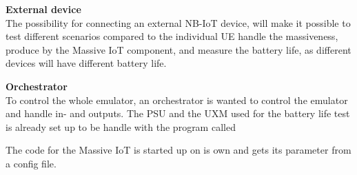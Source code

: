 \textbf{External device}\\
The possibility for connecting an external NB-IoT device, will make it possible to test different scenarios compared to the individual UE handle the massiveness, produce by the Massive IoT component, and measure the battery life, as different devices will have different battery life.

\textbf{Orchestrator}\\
To control the whole emulator, an orchestrator is wanted to control the emulator and handle in- and outputs. The PSU and the UXM used for the battery life test is already set up to be handle with the program called 

The code for the Massive IoT is started up on is own and gets its parameter from a config file. 



